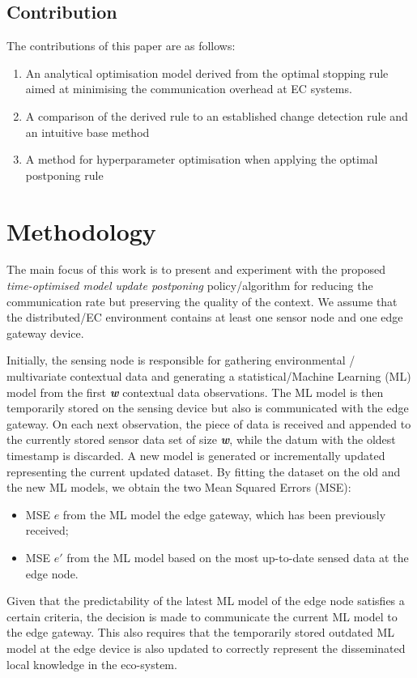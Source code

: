 \documentclass{mpaper}
\begin{document}
\subsection{Contribution}
The contributions of this paper are as follows:
\begin{enumerate}
\item An analytical optimisation model derived from the optimal stopping rule aimed at minimising the communication overhead at EC systems.
\item A comparison of the derived rule to an established change detection rule and an intuitive base method
\item A method for hyperparameter optimisation when applying the optimal postponing rule
\end{enumerate}

\section{Methodology}
The main focus of this work is to present and experiment with the
proposed \textit{time-optimised model update postponing} policy/algorithm for reducing the communication rate but preserving the quality of the context. We assume that the distributed/EC environment contains at least one sensor node and one edge gateway device. 

Initially, the sensing node is responsible for gathering environmental / multivariate contextual data and generating a statistical/Machine Learning (ML) model from the first \textbf{\emph{w}} contextual data observations. The ML model is then temporarily stored on the sensing device but also is communicated with the edge gateway. 
On each next observation, the piece of data is received and appended to the currently stored sensor data set of size \textbf{\emph{w}}, while the datum with the oldest timestamp is discarded. 
A new model is generated or incrementally updated representing the current updated dataset. By fitting the dataset on the old and the new ML models, we obtain the two Mean Squared Errors (MSE):
\begin{itemize}
    \item MSE \textbf{$e$} from the ML model the edge gateway, which has been previously received;
\item MSE \textbf{$e'$} from the ML model based on the most up-to-date sensed data at the edge node.
\end{itemize}

Given that the predictability of the latest ML model of the edge node satisfies a certain criteria, the decision is made to communicate the current ML model to the edge gateway. This also requires that the temporarily stored outdated ML model at the edge device is also updated to correctly represent the disseminated local knowledge in the eco-system.
\end{document}
